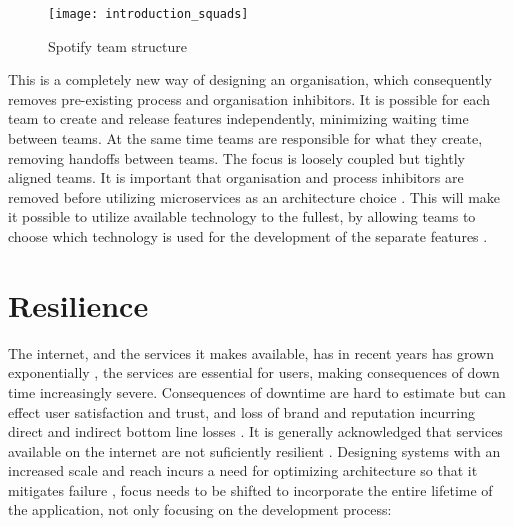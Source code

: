 \begin{figure}[!htb]
  \begin{center} 
	  \texttt{[image: introduction\_squads]}
  \end{center}
  \caption{Spotify team structure}
  \label{fig:introduction_squads}
\end{figure}

This is a completely new way of designing an organisation, which consequently removes pre-existing process and organisation inhibitors. It is possible for each team to create and release features independently, minimizing waiting time between teams. At the same time teams are responsible for what they create, removing handoffs between teams. The focus is loosely coupled but tightly aligned teams.
It is important that organisation and process inhibitors are removed before utilizing microservices as an architecture choice \cite{meshenberg2016microservices}. This will make it possible to utilize available technology to the fullest, by allowing teams to choose which technology is used for the development of the separate features \cite{fowler2014polyglot}. 


\section{Resilience}
The internet, and the services it makes available, has in recent years has grown exponentially \cite[p.~4]{nygard2007release}, the services are essential for users, making consequences of down time increasingly severe. Consequences of downtime are hard to estimate but can effect user satisfaction and trust, and loss of brand and reputation incurring direct and indirect bottom line losses \cite[p.~26]{beyer2016siteReliabilityEngineering}. It is generally acknowledged that services available on the internet are not suficiently resilient \cite{sterbenz2010resilience}. Designing systems with an increased scale and reach incurs a need for optimizing architecture so that it mitigates failure \cite[p.~4]{nygard2007release}, focus needs to be shifted to incorporate the entire lifetime of the application, not only focusing on the development process:


